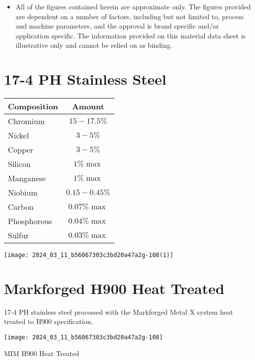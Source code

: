\documentclass[10pt]{article}
\begin{document}
\begin{itemize}
  \item All of the figures contained herein are approximate only. The figures provided are dependent on a number of factors, including but not limited to, process and machine parameters, and the approval is brand specific and/or application specific. The information provided on this material data sheet is illustrative only and cannot be relied on as binding.
\end{itemize}

\section*{17-4 PH Stainless Steel}
\begin{center}
\begin{tabular}{lc}
Composition & Amount \\
\hline
Chromium & $15-17.5 \%$ \\
\hline
Nickel & $3-5 \%$ \\
\hline
Copper & $3-5 \%$ \\
\hline
Silicon & $1 \% \max$ \\
\hline
Manganese & $1 \% \max$ \\
\hline
Niobium & $0.15-0.45 \%$ \\
\hline
Carbon & $0.07 \% \max$ \\
\hline
Phosphorous & $0.04 \% \max$ \\
\hline
Sulfur & $0.03 \% \max$ \\
\hline
\end{tabular}
\end{center}

\begin{center}
\texttt{[image: 2024\_03\_11\_b56067303c3bd20a47a2g-108(1)]}
\end{center}

\section*{Markforged H900 Heat Treated}
17-4 PH stainless steel processed with the Markforged Metal X system heat treated to $\mathrm{H} 900$ specification.

\begin{center}
\texttt{[image: 2024\_03\_11\_b56067303c3bd20a47a2g-108]}
\end{center}

MIM H900 Heat Treated
\end{document}

